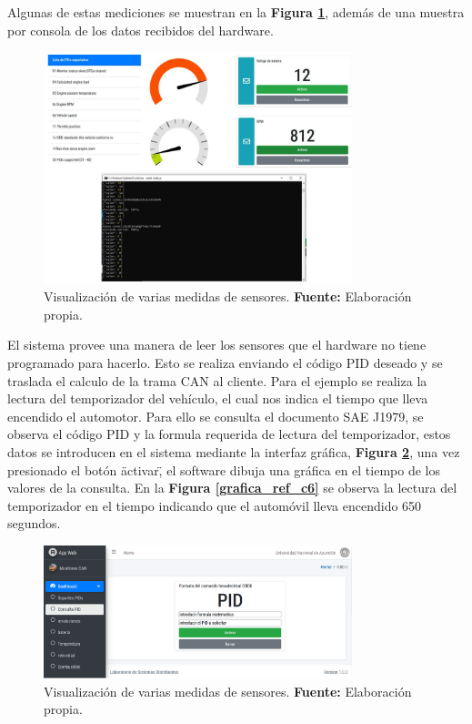 Algunas de estas  mediciones se muestran en la \textbf{Figura \ref{dash_ref_c6}}, además de una muestra por consola de los datos recibidos del hardware. 

\begin{figure}[H]
	\centering
	\includegraphics[width=0.8\textwidth]{./Cap6imagen/dash_fig_c6.jpg}
	\caption [Visualización de varias medidas de sensores.]{Visualización de varias medidas de sensores.  \textbf{ Fuente:} %
		Elaboración propia.}
	\label{dash_ref_c6} %
\end{figure}


El sistema provee una manera de leer los sensores que el hardware no tiene programado para hacerlo. Esto se realiza enviando el código PID deseado y  se traslada el calculo de la trama CAN al cliente. 
Para el ejemplo se realiza la lectura del temporizador del vehículo, el cual nos indica el tiempo que lleva encendido el automotor. 
Para ello se consulta el documento SAE J1979, se observa el código PID y la formula requerida de lectura del temporizador, estos datos se introducen en el sistema mediante la interfaz gráfica, \textbf{Figura \ref{consulta_ref_c6}}, una vez presionado el botón \"activar\", el software dibuja  una gráfica en el tiempo de los valores de la consulta. En la \textbf{Figura \ref{grafica_ref_c6}} se observa la lectura del temporizador en el tiempo indicando que el automóvil lleva encendido 650 segundos. 

\begin{figure}[H]
	\centering
	\includegraphics[width=0.8\textwidth]{./Cap6imagen/consulta_fig_c6.png}
	\caption [Visualización de varias medidas de sensores.]{Visualización de varias medidas de sensores.  \textbf{ Fuente:} %
		Elaboración propia.}
	\label{consulta_ref_c6} %
\end{figure}

